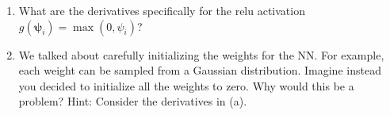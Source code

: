 \begin{enumerate}
  \item   What are the derivatives specifically for the relu activation $g(\boldsymbol{\psi}_i) = \max(0, \psi_i)$?
  \item We talked about carefully initializing the weights for the NN. For example, each weight can be sampled from a Gaussian distribution. Imagine instead you decided to initialize all the weights to zero. Why would this be a problem? Hint: Consider the derivatives in (a). 

 \end{enumerate}
